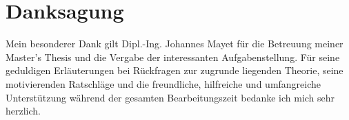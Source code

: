 \chapter*{Danksagung}




Mein besonderer Dank gilt Dipl.-Ing. Johannes Mayet für die Betreuung meiner Master's Thesis
und die Vergabe der interessanten Aufgabenstellung. 
Für  seine geduldigen Erläuterungen bei Rückfragen zur zugrunde liegenden Theorie,
seine motivierenden  Ratschläge 
und die freundliche, hilfreiche und umfangreiche 
Unterstützung während der gesamten Bearbeitungszeit
bedanke ich mich sehr herzlich.
